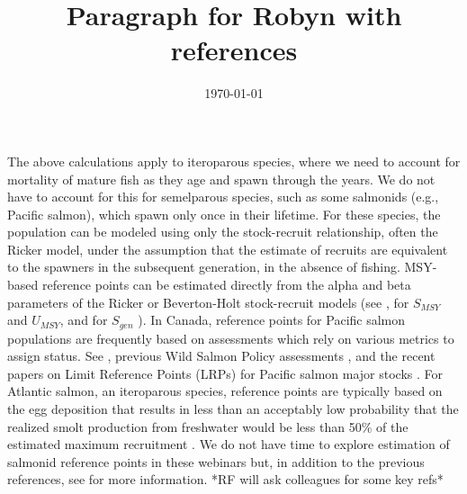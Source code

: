 \documentclass[10pt]{article}
\title{Paragraph for Robyn with references}
\author{}
\date{\today}
\begin{document}
\maketitle



The above calculations apply to iteroparous species, where we need to account for  mortality of mature fish as they age and spawn through the years. We do not have to account for this for semelparous species, such as some salmonids (e.g., Pacific salmon), which spawn only once in their lifetime. For these species, the population can be modeled using only the stock-recruit relationship,  often the Ricker \citep{rickerStockRecruitment1954} model, under the assumption that the estimate of recruits are equivalent to the spawners in the subsequent generation, in the absence of fishing. MSY-based reference points can be estimated directly from the alpha and beta parameters of the Ricker or Beverton-Holt stock-recruit models (see \citet[Table 7.2]{hilbornQuantitativeFisheriesStock1992}, \citet{scheuerellExplicitSolutionCalculating2016} for $S_{MSY}$ and $U_{MSY}$, and \citet{holtIndicatorsStatusBenchmarks2009,holtEvaluationBenchmarksConservation2009} for $S_{gen}$ ). In Canada, reference points for Pacific salmon populations are frequently based on assessments which rely on various metrics to assign status. See \citet{pestalStateSalmonRapid2022}, previous Wild Salmon Policy assessments \citep[e.g.,][]{grant2017FraserSockeye2020,dfoIntegratedBiologicalStatus2016,dfoWildSalmonPolicy2015}, and the recent papers on Limit Reference Points (LRPs) for Pacific salmon major stocks \citep{holtGuidelinesDefiningLimitInpress,holtCaseStudyApplicationsInpress,dfoMethodologiesGuidelinesDefining2022}. For Atlantic salmon, an iteroparous species, reference points are typically based on the egg deposition that results in less than an acceptably low probability that the realized smolt production from freshwater would be less than 50\% of the estimated maximum recruitment \citep{dfoDevelopmentReferencePoints2015,dfoDefinitionPrecautionaryApproach2022}. We do not have time to explore estimation of salmonid reference points in these webinars but, in addition to the previous references, see \citet{chaputConsiderationsDefiningReference2012,portleyLimitReferencePoints2014,grantEvaluationUncertaintyFraser2011,grantIntegratedBiologicalStatus2013,holtImpactTimevaryingProductivity2020} for more information. *RF will ask colleagues for some key refs*


 

\end{document}
